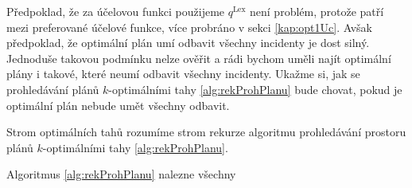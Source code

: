 Předpoklad, že za účelovou funkci použijeme $q^{\text{Lex}}$ není problém, protože patří mezi preferované účelové funkce, více probráno v sekci \ref{kap:opt1Uc}.
Avšak předpoklad, že optimální plán umí odbavit všechny incidenty je dost silný.
Jednoduše takovou podmínku nelze ověřit a rádi bychom uměli najít optimální plány i takové, které neumí odbavit všechny incidenty.
Ukažme si, jak se prohledávání plánů $k$-optimálními tahy \ref{alg:rekProhPlanu} bude chovat, pokud je optimální plán nebude umět všechny odbavit.

\begin{definice}
  Strom optimálních tahů rozumíme strom rekurze algoritmu prohledávání prostoru plánů $k$-optimálními tahy \ref{alg:rekProhPlanu}.
\end{definice}

\begin{veta}
  Algoritmus \ref{alg:rekProhPlanu} nalezne všechny 
\end{veta}
\begin{dukaz}
\end{dukaz}

%
%
%

